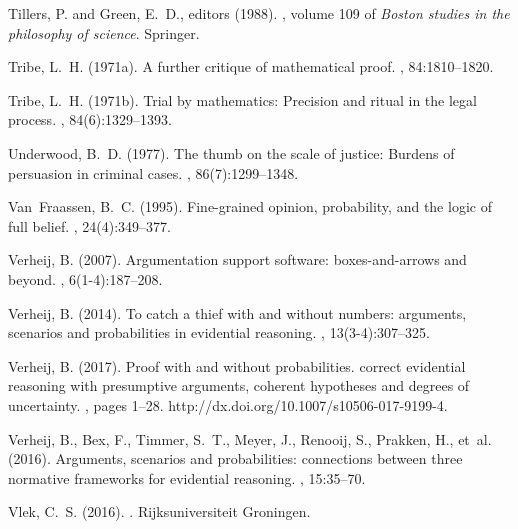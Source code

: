 \documentclass[10pt,leqno]{article}
\begin{document}
\begin{thebibliography}{}
Tillers, P. and Green, E.~D., editors (1988).
, volume 109 of {\em Boston studies in the philosophy
  of science}.
\newblock Springer.

Tribe, L.~H. (1971a).
\newblock A further critique of mathematical proof.
, 84:1810--1820.

Tribe, L.~H. (1971b).
\newblock Trial by mathematics: Precision and ritual in the legal process.
, 84(6):1329--1393.

Underwood, B.~D. (1977).
\newblock The thumb on the scale of justice: Burdens of persuasion in criminal
  cases.
, 86(7):1299--1348.

Van~Fraassen, B.~C. (1995).
\newblock Fine-grained opinion, probability, and the logic of full belief.
, 24(4):349--377.

Verheij, B. (2007).
\newblock Argumentation support software: boxes-and-arrows and beyond.
, 6(1-4):187--208.

Verheij, B. (2014).
\newblock To catch a thief with and without numbers: arguments, scenarios and
  probabilities in evidential reasoning.
, 13(3-4):307--325.

Verheij, B. (2017).
\newblock Proof with and without probabilities. correct evidential reasoning
  with presumptive arguments, coherent hypotheses and degrees of uncertainty.
, pages 1--28.
\newblock http://dx.doi.org/10.1007/s10506-017-9199-4.

Verheij, B., Bex, F., Timmer, S.~T., Meyer, J., Renooij, S., Prakken, H.,
  et~al. (2016).
\newblock Arguments, scenarios and probabilities: connections between three
  normative frameworks for evidential reasoning.
, 15:35--70.

Vlek, C.~S. (2016).
.
\newblock Rijksuniversiteit Groningen.


\end{thebibliography}
\end{document}
